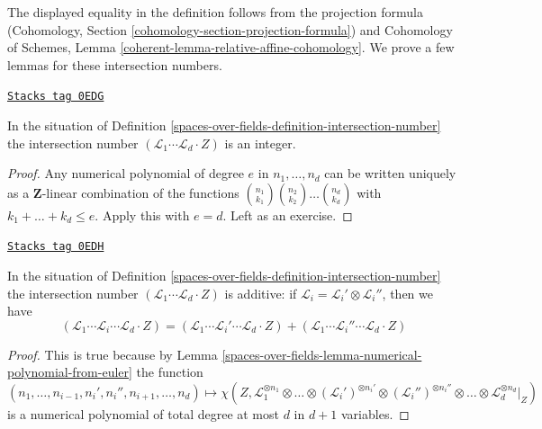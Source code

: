 The displayed equality in the definition follows from
the projection formula
(Cohomology, Section \ref{cohomology-section-projection-formula}) and
Cohomology of Schemes, Lemma
\ref{coherent-lemma-relative-affine-cohomology}.
We prove a few lemmas for these intersection numbers.

\begin{lemma}
\label{spaces-over-fields-lemma-intersection-number-integer}
\href{https://stacks.math.columbia.edu/tag/0EDG}{\texttt{Stacks tag 0EDG}}

In the situation of Definition \ref{spaces-over-fields-definition-intersection-number}
the intersection number
$(\mathcal{L}_1 \cdots \mathcal{L}_d \cdot Z)$
is an integer.
\end{lemma}

\begin{proof}
Any numerical polynomial of degree $e$ in $n_1, \ldots, n_d$ can be
written uniquely as a $\mathbf{Z}$-linear combination of the functions
${n_1 \choose k_1}{n_2 \choose k_2} \ldots {n_d \choose k_d}$ with
$k_1 + \ldots + k_d \leq e$. Apply this with $e = d$.
Left as an exercise.
\end{proof}

\begin{lemma}
\label{spaces-over-fields-lemma-intersection-number-additive}
\href{https://stacks.math.columbia.edu/tag/0EDH}{\texttt{Stacks tag 0EDH}}

In the situation of Definition \ref{spaces-over-fields-definition-intersection-number}
the intersection number
$(\mathcal{L}_1 \cdots \mathcal{L}_d \cdot Z)$
is additive: if $\mathcal{L}_i = \mathcal{L}_i' \otimes \mathcal{L}_i''$,
then we have
$$
(\mathcal{L}_1 \cdots \mathcal{L}_i \cdots \mathcal{L}_d \cdot Z) =
(\mathcal{L}_1 \cdots \mathcal{L}_i' \cdots \mathcal{L}_d \cdot Z) +
(\mathcal{L}_1 \cdots \mathcal{L}_i'' \cdots \mathcal{L}_d \cdot Z)
$$
\end{lemma}

\begin{proof}
This is true because by Lemma \ref{spaces-over-fields-lemma-numerical-polynomial-from-euler}
the function
$$
(n_1, \ldots, n_{i - 1}, n_i', n_i'', n_{i + 1}, \ldots, n_d)
\mapsto
\chi(Z, \mathcal{L}_1^{\otimes n_1} \otimes
\ldots \otimes (\mathcal{L}_i')^{\otimes n_i'} \otimes
(\mathcal{L}_i'')^{\otimes n_i''} \otimes \ldots \otimes
\mathcal{L}_d^{\otimes n_d}|_Z)
$$
is a numerical polynomial of total degree at most $d$ in $d + 1$ variables.
\end{proof}

